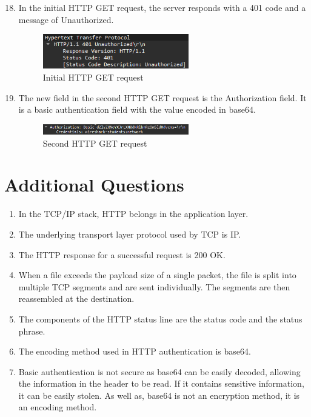 \documentclass{article}
\begin{document}
\begin{enumerate}
    \setcounter{enumi}{17}
    \item In the initial HTTP GET request, the server responds with a 401 code and a message of Unauthorized. 
    \begin{figure}[ht!]
        \centering
        \includegraphics[width=0.6\textwidth]{p6_1}
        \caption{Initial HTTP GET request}
        \label{fig:p6_1}
    \end{figure}
    \item The new field in the second HTTP GET request is the Authorization field. It is a basic authentication field with the value encoded in base64.
    \begin{figure}[ht!]
        \centering
        \includegraphics[width=0.6\textwidth]{p6_2}
        \caption{Second HTTP GET request}
        \label{fig:p6_2}
    \end{figure}
\end{enumerate}

\section{Additional Questions}
\begin{enumerate}
    \item In the TCP/IP stack, HTTP belongs in the application layer.
    \item The underlying transport layer protocol used by TCP is IP.
    \item The HTTP response for a successful request is 200 OK.
    \item When a file exceeds the payload size of a single packet, the file is split into multiple TCP segments and are sent individually. The segments are then reassembled at the destination.
    \item The components of the HTTP status line are the status code and the status phrase.
    \item The encoding method used in HTTP authentication is base64.
    \item Basic authentication is not secure as base64 can be easily decoded, allowing the information in the header to be read. If it contains sensitive information, it can be easily stolen. As well as, base64 is not an encryption method, it is an encoding method.
\end{enumerate}

\end{document}
